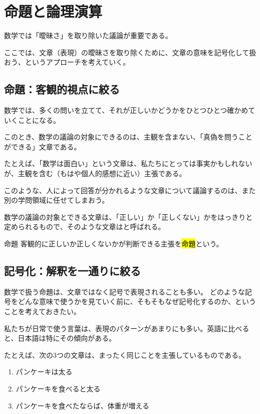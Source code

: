 \documentclass[../../imaging-math]{subfiles}
\begin{document}
\section{命題と論理演算}

数学では「曖昧さ」を取り除いた議論が重要である。

ここでは、文章（表現）の曖昧さを取り除くために、文章の意味を記号化して扱おう、というアプローチを考えていく。

\subsection{命題：客観的視点に絞る}

数学では、多くの問いを立てて、それが正しいかどうかをひとつひとつ確かめていくことになる。

このとき、数学の議論の対象にできるのは、主観を含まない、「真偽を問うことができる」文章である。

\br

たとえば、「数学は面白い」という文章は、私たちにとっては事実かもしれないが、主観を含む（もはや個人的感想に近い）主張である。

このような、人によって回答が分かれるような文章について議論するのは、また別の学問領域に任せてしまおう。

\br

数学の議論の対象とできる文章は、「正しい」か「正しくない」かをはっきりと定められるもので、そのような文章はと呼ばれる。

\begin{definition}{命題}
  客観的に正しいか正しくないかが判断できる主張を\hl{命題}という。
\end{definition}

\subsection{記号化：解釈を一通りに絞る}

数学で扱う命題は、文章ではなく記号で表現されることも多い。
どのような記号をどんな意味で使うかを見ていく前に、そもそもなぜ記号化するのか、ということを考えておきたい。

\br

私たちが日常で使う言葉は、表現のパターンがあまりにも多い。英語に比べると、日本語は特にその傾向がある。

たとえば、次の3つの文章は、まったく同じことを主張しているものである。

\begin{enumerate}
  \item パンケーキは太る
  \item パンケーキを食べると太る
  \item パンケーキを食べたならば、体重が増える
\end{enumerate}
\end{document}
